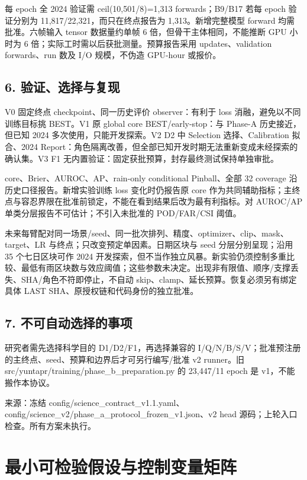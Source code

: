\documentclass[UTF8,fontset=fandol,10pt]{ctexart}
\begin{document}
每 epoch 全 2024 验证需 ceil(10,501/\allowbreak{}8)=1,313 forwards；B9/\allowbreak{}B17 若每 epoch 验证分别为 11,817/\allowbreak{}22,321，而只在终点报告为 1,313。新增完整模型 forward 均需批准。六帧输入 tensor 数据量约单帧 6 倍，但骨干主体相同，不能推断 GPU 小时为 6 倍；实际工时需以后获批测量。预算报告采用 updates、validation forwards、run 数及 I/\allowbreak{}O 规模，不伪造 GPU-hour 或报价。

\subsection{6. 验证、选择与复现}

V0 固定终点 checkpoint、同一历史评价 observer：有利于 loss 消融，避免以不同训练目标挑 BEST。V1 原 global core BEST/\allowbreak{}early-stop：与 Phase-A 历史接近，但已知 2024 多次使用，只能开发探索。V2 D2 中 Selection 选择、Calibration 拟合、2024 Report：角色隔离改善，但全部已知开发时期无法重新变成未经探索的确认集。V3 F1 无内置验证：固定获批预算，封存最终测试保持单独审批。

core、Brier、AUROC、AP、rain-only conditional Pinball、全部 32 coverage 沿历史口径报告。新增实验训练 loss 变化时仍报告原 core 作为共同辅助指标；主终点与容忍界限在批准前锁定，不能在看到结果后改为最有利指标。对 AUROC/\allowbreak{}AP 单类分层报告不可估计；不引入未批准的 POD/\allowbreak{}FAR/\allowbreak{}CSI 阈值。

未来每臂配对同一场景/\allowbreak{}seed、同一批次排列、精度、optimizer、clip、mask、target、LR 与终点；只改变预定单因素。日期区块与 seed 分层分别呈现；沿用 35 个七日区块可作 2024 开发探索，但不当作独立风暴。新实验仍须控制多重比较、最低有雨区块数与效应阈值；这些参数未决定。出现非有限值、顺序/\allowbreak{}支撑丢失、SHA/\allowbreak{}角色不符即停止，不自动 skip、clamp、延长预算。恢复必须另有绑定具体 LAST SHA、原授权链和代码身份的独立批准。

\subsection{7. 不可自动选择的事项}

研究者需先选择科学目的 D1/\allowbreak{}D2/\allowbreak{}F1，再选择兼容的 I/\allowbreak{}Q/\allowbreak{}N/\allowbreak{}B/\allowbreak{}S/\allowbreak{}V；批准预注册的主终点、seed、预算和边界后才可另行编写/\allowbreak{}批准 v2 runner。旧 src/\allowbreak{}yuntapr/\allowbreak{}training/\allowbreak{}phase\_\allowbreak{}b\_\allowbreak{}preparation.py 的 23,447/\allowbreak{}11 epoch 是 v1，不能搬作本协议。

来源：冻结 config/\allowbreak{}science\_\allowbreak{}contract\_\allowbreak{}v1.1.yaml、config/\allowbreak{}science\_\allowbreak{}v2/\allowbreak{}phase\_\allowbreak{}a\_\allowbreak{}protocol\_\allowbreak{}frozen\_\allowbreak{}v1.json、v2 head 源码；上轮入口检查。所有方案未执行。
\clearpage\section{最小可检验假设与控制变量矩阵}
\end{document}
